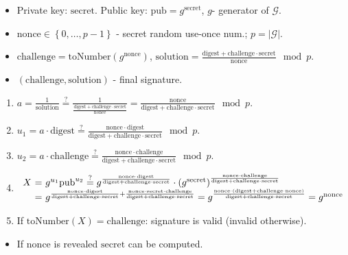 \begin{frame}
\vskip -0.15cm
\begin{emptyTheorem}
\begin{itemize}
\item Private key: $\mathrm{secret}$. Public key: $\mathrm{pub} = g^{\mathrm{secret}}$, $g$- generator of $\mathcal G$. 
\item $\mathrm{nonce} \in \left\{0,\dots, p-1\right\}$ - secret random use-once num.; $p=|\mathcal G|$.
\item $\mathrm{challenge} = \mathrm{toNumber}\left(g^{\mathrm{nonce}}\right)$,  $\mathrm{solution} = \frac{\mathrm{digest} + \mathrm{challenge}\cdot \mathrm{secret}}{\mathrm{nonce}} \mod p$.
\item $(\mathrm{challenge},\mathrm{solution})$ - final signature.
\end{itemize}
\end{emptyTheorem}
\vskip -0.15cm
\begin{emptyTheorem}
\vskip -0.15cm
\begin{enumerate}
\item $a = \frac{1}{\mathrm{solution}} \stackrel{?}{=} \frac{1}{\frac{\mathrm{digest} + \mathrm{challenge}\cdot \mathrm{secret}}{\mathrm{nonce}}} = \frac{\mathrm{nonce}}{\mathrm{digest}+ \mathrm{challenge}\cdot \mathrm{secret}} \mod p$.
\item $u_1 = a\cdot \mathrm{digest}\stackrel{?}{=}  \frac{\mathrm{nonce}\cdot \mathrm{digest} }{\mathrm{digest} + \mathrm{challenge}\cdot \mathrm{secret}} \mod p$.
\item $u_2 = a \cdot \mathrm{challenge} \stackrel{?}{=}  \frac{ \mathrm{nonce} \cdot \mathrm{challenge} }{\mathrm{digest} + \mathrm{challenge}\cdot \mathrm{secret}} \mod p$.
\item $
\begin{array}{r@{~}c@{~}l}
X &=&g^{u_1} \mathrm{pub}^{u_2} \stackrel{?}{=}  g^{\frac{ \mathrm{nonce}\cdot \mathrm{digest} }{\mathrm{digest}+ \mathrm{challenge} \cdot \mathrm{secret}}} \cdot \left(g^{\mathrm{secret}} \right)^{ \frac{ \mathrm{nonce}\cdot \mathrm{challenge} }{\mathrm{digest} + \mathrm{challenge} \cdot \mathrm{secret}}} \\
&=& g^{\frac{\mathrm{nonce}\cdot \mathrm{digest}}{\mathrm{digest}+ \mathrm{challenge} \cdot \mathrm{secret}} +  \frac{\mathrm{nonce}\cdot \mathrm{secret}\cdot \mathrm{challenge} }{\mathrm{digest} + \mathrm{challenge} \cdot \mathrm{secret}}} = g^{\frac{\mathrm{nonce}\cdot(\mathrm{digest} + \mathrm{challenge} \cdot \mathrm{nonce}) }{\mathrm{digest} +  \mathrm{challenge} \cdot \mathrm{secret}}} = g^{\mathrm{nonce}}
\end{array}
$
\item If $\mathrm{toNumber} \left(X\right) = \mathrm{challenge}$: signature is valid (invalid otherwise).
\end{enumerate}
\end{emptyTheorem}
\vskip -0.15cm
\begin{itemize}
\item If $\mathrm{nonce}$ is revealed $\mathrm{secret}$ can be computed.
\end{itemize}
\end{frame}